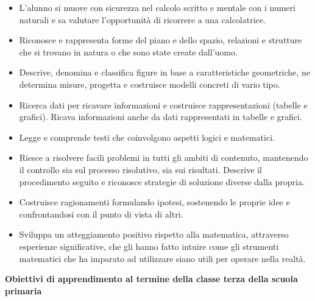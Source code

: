 \documentclass[12pt]{report}
\begin{document}
\begin{itemize}
\item L’alunno si muove con sicurezza nel calcolo scritto e mentale con i numeri naturali e sa valutare l’opportunità di ricorrere a una calcolatrice.

\item Riconosce e rappresenta forme del piano e dello spazio, relazioni e strutture che si trovano in natura o che sono state create dall’uomo.

\item Descrive, denomina e classifica figure in base a caratteristiche geometriche, ne determina misure, progetta e costruisce modelli concreti di vario tipo.

\item Ricerca dati per ricavare informazioni e costruisce rappresentazioni (tabelle e grafici). Ricava informazioni anche da dati rappresentati in tabelle e grafici.

\item Legge e comprende testi che coinvolgono aspetti logici e matematici.

\item Riesce a risolvere facili problemi in tutti gli ambiti di contenuto, mantenendo il controllo sia sul processo risolutivo, sia sui risultati. Descrive il procedimento seguito e riconosce strategie di soluzione diverse dalla propria.

\item Costruisce ragionamenti formulando ipotesi, sostenendo le proprie idee e confrontandosi con il punto di vista di altri.

\item Sviluppa un atteggiamento positivo rispetto alla matematica, attraverso esperienze significative, che gli hanno fatto intuire come gli strumenti matematici che ha imparato ad utilizzare siano utili per operare nella realtà.
\end{itemize}

\medskip
\noindent \textbf{Obiettivi di apprendimento al termine della classe terza della scuola primaria}
\end{document}
